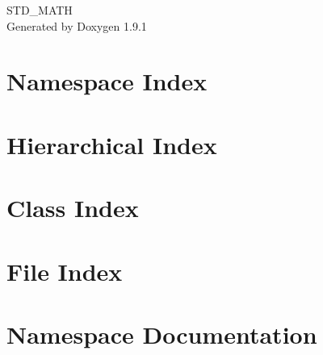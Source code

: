 \let\mypdfximage\pdfximage\def\pdfximage{\immediate\mypdfximage}\documentclass[twoside]{book}
\newcommand{\+}{\discretionary{\mbox{\scriptsize$\hookleftarrow$}}{}{}}
\newcommand{\clearemptydoublepage}{%
  \newpage{\pagestyle{empty}\cleardoublepage}%
}
\begin{document}
\raggedbottom

\hypersetup{pageanchor=false,
             bookmarksnumbered=true,
             pdfencoding=unicode
            }
\begin{titlepage}
\vspace*{7cm}
\begin{center}%
{\Large STD\+\_\+\+MATH }\\
\vspace*{1cm}
{\large Generated by Doxygen 1.9.1}\\
\end{center}
\end{titlepage}
\clearemptydoublepage
{}
\tableofcontents
\clearemptydoublepage
{}
\hypersetup{pageanchor=true}

\chapter{Namespace Index}

\chapter{Hierarchical Index}

\chapter{Class Index}

\chapter{File Index}

\chapter{Namespace Documentation}








\end{document}
